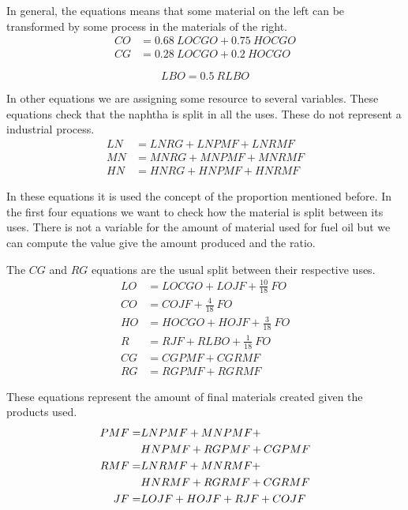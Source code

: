 \documentclass[12pt,a4paper]{report}
\begin{document}
In general, the equations means that some material on the left can be transformed by some process in the materials of the right.
\begin{align}
CO &= 0.68\ LOCGO + 0.75\ HOCGO\\
CG &= 0.28\ LOCGO + 0.2\ HOCGO
\end{align}

\begin{equation}
LBO = 0.5\ RLBO
\end{equation}

In other equations we are assigning some resource to several variables. These equations check that the naphtha is split in all the uses. These do not represent a industrial process.
\begin{align}
LN &= LNRG + LNPMF + LNRMF\\
MN &= MNRG + MNPMF + MNRMF\\
HN &= HNRG + HNPMF + HNRMF
\end{align}

In these equations it is used the concept of the proportion mentioned before. In the first four equations we want to check how the material is split between its uses. There is not a variable for the amount of material used for fuel oil but we can compute the value give the amount produced and the ratio.

The $CG$ and $RG$ equations are the usual split between their respective uses.
\begin{align}
LO &= LOCGO + LOJF + \frac{10}{18}\ FO\\
CO &= COJF + \frac{4}{18}\ FO\\
HO &= HOCGO + HOJF + \frac{3}{18}\ FO\\
R &= RJF + RLBO + \frac{1}{18}\ FO\\
CG &= CGPMF + CGRMF\\
RG &= RGPMF + RGRMF
\end{align}

These equations represent the amount of final materials created given the products used.
\begin{align}
PMF =& LNPMF + MNPMF +\notag\\
     & HNPMF + RGPMF + CGPMF\\
RMF =& LNRMF + MNRMF +\notag\\
     & HNRMF + RGRMF + CGRMF\\ 
JF  =& LOJF + HOJF + RJF + COJF
\end{align}
\end{document}
